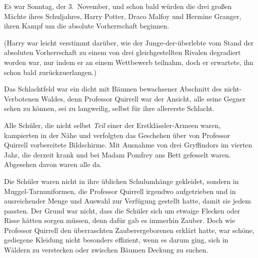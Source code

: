 \lettrine{E}{s} war Sonntag, der 3.~November, und schon bald würden die drei großen Mächte ihres Schuljahres, Harry Potter, Draco Malfoy und Hermine Granger, ihren Kampf um die absolute Vorherrschaft beginnen.

(Harry war leicht verstimmt darüber, wie der Junge-der-überlebte vom Stand der absoluten Vorherrschaft zu einem von drei gleichgestellten Rivalen degradiert worden war, nur indem er an einem Wettbewerb teilnahm, doch er erwartete, ihn schon bald zurückzuerlangen.)

Das Schlachtfeld war ein dicht mit Bäumen bewachsener Abschnitt des nicht-Verbotenen Waldes, denn Professor Quirrell war der Ansicht, alle seine Gegner sehen zu können, sei zu langweilig, selbst für ihre allererste Schlacht.

Alle Schüler, die nicht selbst \emph{Teil} einer der Erstklässler-Armeen waren, kampierten in der Nähe und verfolgten das Geschehen über von Professor Quirrell vorbereitete Bildschirme. Mit Ausnahme von drei Gryffindors im vierten Jahr, die derzeit krank und bei Madam Pomfrey ans Bett gefesselt waren. Abgesehen davon waren alle da.

Die Schüler waren nicht in ihre üblichen Schulumhänge gekleidet, sondern in Muggel-Tarnuniformen, die Professor Quirrell irgendwo aufgetrieben und in ausreichender Menge und Auswahl zur Verfügung gestellt hatte, damit sie jedem passten. Der Grund war nicht, dass die Schüler sich um etwaige Flecken oder Risse hätten sorgen müssen, denn dafür gab es immerhin Zauber. Doch wie Professor Quirrell den überraschten Zauberergeborenen erklärt hatte, war schöne, gediegene Kleidung nicht besonders effizient, wenn es darum ging, sich in Wäldern zu verstecken oder zwischen Bäumen Deckung zu suchen.

